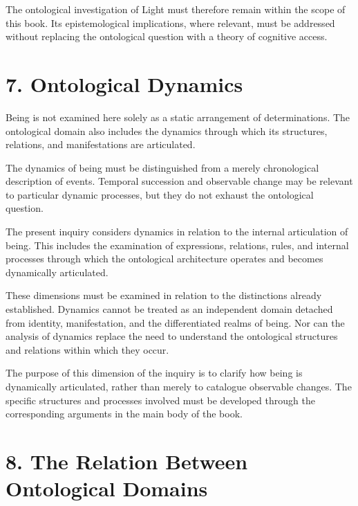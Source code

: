 The ontological investigation of Light must therefore
remain within the scope of this book. Its epistemological
implications, where relevant, must be addressed without
replacing the ontological question with a theory of
cognitive access.


\section*{7. Ontological Dynamics}

Being is not examined here solely as a static arrangement
of determinations. The ontological domain also includes
the dynamics through which its structures, relations,
and manifestations are articulated.

The dynamics of being must be distinguished from a
merely chronological description of events. Temporal
succession and observable change may be relevant to
particular dynamic processes, but they do not exhaust
the ontological question.

The present inquiry considers dynamics in relation
to the internal articulation of being. This includes
the examination of expressions, relations, rules,
and internal processes through which the ontological
architecture operates and becomes dynamically
articulated.

These dimensions must be examined in relation to
the distinctions already established. Dynamics
cannot be treated as an independent domain detached
from identity, manifestation, and the differentiated
realms of being. Nor can the analysis of dynamics
replace the need to understand the ontological
structures and relations within which they occur.

The purpose of this dimension of the inquiry is
to clarify how being is dynamically articulated,
rather than merely to catalogue observable changes.
The specific structures and processes involved
must be developed through the corresponding
arguments in the main body of the book.


\section*{8. The Relation Between Ontological Domains}


